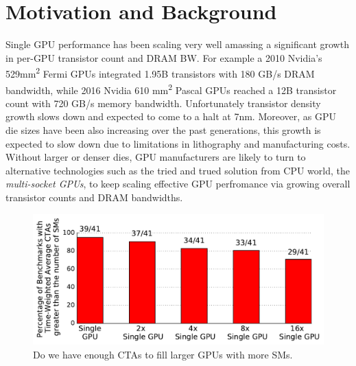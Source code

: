 \section{Motivation and Background}
\label{background}

Single GPU performance has been scaling very well amassing a significant
growth in per-GPU transistor count and DRAM BW. For example a 2010 Nvidia's
529mm\textsuperscript{2} Fermi GPUs integrated 1.95B transistors with 180 GB/s
DRAM bandwidth, while 2016 Nvidia 610 mm\textsuperscript{2} Pascal GPUs reached
a 12B transistor count with 720 GB/s memory bandwidth. Unfortunately transistor density
growth slows down and expected to come to a halt at 7nm. Moreover, as GPU die sizes
have been also increasing over the past generations, this growth is expected to
slow down due to limitations in lithography and manufacturing costs. 
Without larger or denser dies, GPU manufacturers are likely to turn to 
alternative technologies such as the tried and trued solution from CPU world,
the \textit{multi-socket GPUs}, to keep scaling effective GPU perfromance via 
growing overall transistor counts and DRAM bandwidths. 


\begin{figure}[t] 
    \centering
    \includegraphics[width=1.0\columnwidth]{figures/plot_ctas_per_sm.pdf}
    \caption{Do we have enough CTAs to fill larger GPUs with more SMs.}
    \label{fig:ctas}
\end{figure}

